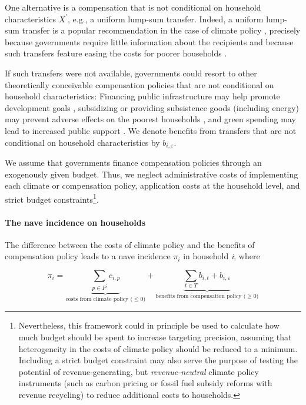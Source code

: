 \documentclass[12pt, a4paper]{article}
\begin{document}
One alternative is a compensation that is not conditional on household characteristics $X^{\prime}$, e.g., a uniform lump-sum transfer. Indeed, a uniform lump-sum transfer is a popular recommendation in the case of climate policy \autocite{Stiglitz.2017,Baranzini.2000,Metcalf.2009,Sager.2023}, precisely because governments require little information about the recipients and because such transfers feature easing the costs for poorer households \autocite{Budolfson.2021,vanderPloeg.2022}. 

If such transfers were not available, governments could resort to other theoretically conceivable compensation policies that are not conditional on household characteristics: Financing public infrastructure may help promote development goals \autocite{Franks.2018,Jakob.2016}, subsidizing or providing subsistence goods (including energy) may prevent adverse effects on the poorest households \autocite{Greve.2022,Schaffitzel.2019}, and green spending may lead to increased public support \autocite{Sommer.2022,Kotchen.2017,Dechezlepretre.2022}. We denote benefits from transfers that are not conditional on household characteristics by $b_{i,\varepsilon}$.

We assume that governments finance compensation policies through an exogenously given budget. Thus, we neglect administrative costs of implementing each climate or compensation policy, application costs at the household level, and strict budget constraints\footnote{Nevertheless, this framework could in principle be used to calculate how much budget should be spent to increase targeting precision, assuming that heterogeneity in the costs of climate policy should be reduced to a minimum. Including a strict budget constraint may also serve the purpose of testing the potential of revenue-generating, but \textit{revenue-neutral} climate policy instruments (such as carbon pricing or fossil fuel subsidy reforms with revenue recycling) to reduce additional costs to households.}. 

\paragraph{The nave incidence on households}
The difference between the costs of climate policy and the benefits of compensation policy leads to a nave incidence $\pi_{i}$ in household \textit{i}, where

\begin{equation} \label{eq:pi}
    \pi_{i} = \underbrace{\sum_{p\in P^{\prime}} c_{i,p}}_{\text{costs from climate policy ($\leq 0$)}} + \underbrace{\sum_{t\in T} b_{i,t} + b_{i,\varepsilon}}_{\text{benefits from compensation policy ($\geq 0$)}}
\end{equation}
\end{document}
